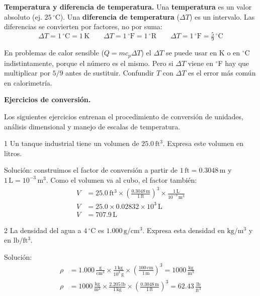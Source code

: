 \textbf{Temperatura y diferencia de temperatura.} Una
\textbf{temperatura} es un valor absoluto (ej. $25\,^\circ$C). Una
\textbf{diferencia de temperatura} ($\Delta T$) es un intervalo. Las
diferencias se convierten por factores, no por suma:
\[
\Delta T = 1\,^\circ\mathrm{C} = 1\,\mathrm{K}
\qquad
\Delta T = 1\,^\circ\mathrm{F} = 1\,^\circ\mathrm{R}
\qquad
\Delta T = 1\,^\circ\mathrm{F} = \tfrac{5}{9}\,^\circ\mathrm{C}
\]

\begin{notaimportante}
En problemas de calor sensible ($Q = m c_p \Delta T$) el $\Delta T$
se puede usar en K o en $^\circ$C indistintamente, porque el número
es el mismo. Pero si $\Delta T$ viene en $^\circ$F hay que
multiplicar por $5/9$ antes de sustituir. Confundir $T$ con $\Delta T$
es el error más común en calorimetría.
\end{notaimportante}


\textbf{Ejercicios de conversión.}

Los siguientes ejercicios entrenan el procedimiento de conversión de
unidades, análisis dimensional y manejo de escalas de temperatura.

\begin{exercise}{1}{}
Un tanque industrial tiene un volumen de $25.0\,\mathrm{ft^3}$.
Expresa este volumen en litros.

Solución: construimos el factor de conversión a partir de
$1\,\mathrm{ft} = 0.3048\,\mathrm{m}$ y $1\,\mathrm{L} =
10^{-3}\,\mathrm{m^3}$. Como el volumen va al cubo, el factor también:
\begin{align*}
V &= 25.0\,\mathrm{ft^3} \times
\left(\frac{0.3048\,\mathrm{m}}{1\,\mathrm{ft}}\right)^3
\times \frac{1\,\mathrm{L}}{10^{-3}\,\mathrm{m^3}} \\[4pt]
V &= 25.0 \times 0.02832 \times 10^{3}\,\mathrm{L} \\[4pt]
V &= 707.9\,\mathrm{L}
\end{align*}
\end{exercise}

\begin{exercise}{2}{}
La densidad del agua a $4\,^\circ$C es $1.000\,\mathrm{g/cm^3}$.
Expresa esta densidad en $\mathrm{kg/m^3}$ y en
$\mathrm{lb/ft^3}$.

Solución:
\begin{align*}
\rho &= 1.000\,\frac{\mathrm{g}}{\mathrm{cm^3}}
\times \frac{1\,\mathrm{kg}}{10^{3}\,\mathrm{g}}
\times \left(\frac{100\,\mathrm{cm}}{1\,\mathrm{m}}\right)^3
= 1000\,\frac{\mathrm{kg}}{\mathrm{m^3}} \\[6pt]
\rho &= 1000\,\frac{\mathrm{kg}}{\mathrm{m^3}}
\times \frac{2.205\,\mathrm{lb}}{1\,\mathrm{kg}}
\times \left(\frac{0.3048\,\mathrm{m}}{1\,\mathrm{ft}}\right)^3
= 62.43\,\frac{\mathrm{lb}}{\mathrm{ft^3}}
\end{align*}
\end{exercise}

